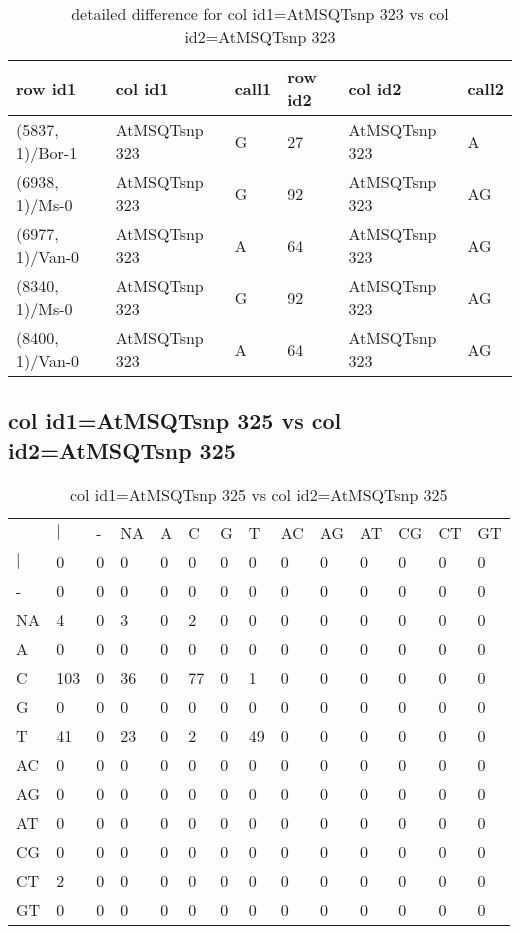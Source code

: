 \begin{center}
\begin{longtable}{|l|l|l|l|l|l|}
\caption{detailed difference for col id1=AtMSQTsnp 323 vs col id2=AtMSQTsnp 323} \label{table_dm859}\\
\hline
row id1&col id1&call1&row id2&col id2&call2\\
\hline
(5837, 1)/Bor-1&AtMSQTsnp 323&G&27&AtMSQTsnp 323&A\\
(6938, 1)/Ms-0&AtMSQTsnp 323&G&92&AtMSQTsnp 323&AG\\
(6977, 1)/Van-0&AtMSQTsnp 323&A&64&AtMSQTsnp 323&AG\\
(8340, 1)/Ms-0&AtMSQTsnp 323&G&92&AtMSQTsnp 323&AG\\
(8400, 1)/Van-0&AtMSQTsnp 323&A&64&AtMSQTsnp 323&AG\\
\hline
\end{longtable}
\end{center}

\subsection{col id1=AtMSQTsnp 325 vs col id2=AtMSQTsnp 325}
\begin{center}
\begin{longtable}{|l|l|l|l|l|l|l|l|l|l|l|l|l|l|}
\caption{col id1=AtMSQTsnp 325 vs col id2=AtMSQTsnp 325} \label{table_dm860}\\
\hline
\\
\hline
&$|$&-&NA&A&C&G&T&AC&AG&AT&CG&CT&GT\\
$|$&0&0&0&0&0&0&0&0&0&0&0&0&0\\
-&0&0&0&0&0&0&0&0&0&0&0&0&0\\
NA&4&0&3&0&2&0&0&0&0&0&0&0&0\\
A&0&0&0&0&0&0&0&0&0&0&0&0&0\\
C&103&0&36&0&77&0&1&0&0&0&0&0&0\\
G&0&0&0&0&0&0&0&0&0&0&0&0&0\\
T&41&0&23&0&2&0&49&0&0&0&0&0&0\\
AC&0&0&0&0&0&0&0&0&0&0&0&0&0\\
AG&0&0&0&0&0&0&0&0&0&0&0&0&0\\
AT&0&0&0&0&0&0&0&0&0&0&0&0&0\\
CG&0&0&0&0&0&0&0&0&0&0&0&0&0\\
CT&2&0&0&0&0&0&0&0&0&0&0&0&0\\
GT&0&0&0&0&0&0&0&0&0&0&0&0&0\\
\hline
\end{longtable}
\end{center}

